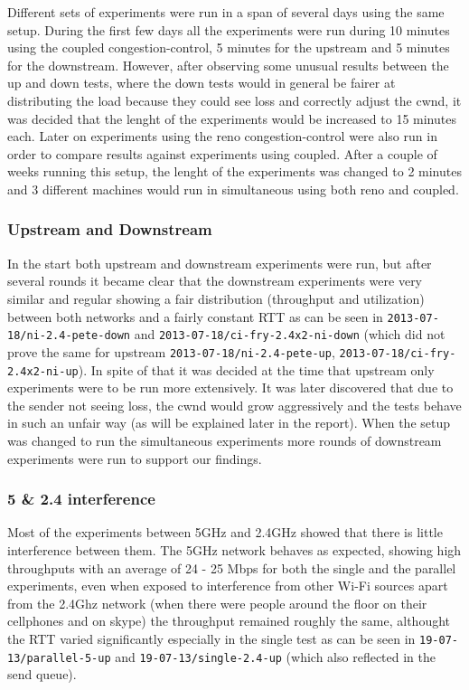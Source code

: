 \documentclass[12pt,a4paper]{article}
\begin{document}
Different sets of experiments were run in a span of several days using the same
setup. During the first few days all the experiments were run during 10 minutes
using the coupled congestion-control, 5 minutes for the upstream and 5 minutes
for the downstream. However, after observing some unusual results between the up
and down tests, where the down tests would in general be fairer at distributing
the load because they could see loss and correctly adjust the cwnd, it was
decided that the lenght of the experiments would be increased to 15 minutes
each. Later on experiments using the reno congestion-control were also run in
order to compare results against experiments using coupled. After a couple of
weeks running this setup, the lenght of the experiments was changed to 2 minutes
and 3 different machines would run in simultaneous using both reno and coupled.


\subsubsection{Upstream and Downstream}
In the start both upstream and downstream experiments were run, but after
several rounds it became clear that the downstream experiments were very similar
and regular showing a fair distribution (throughput and utilization) between
both networks and a fairly constant RTT as can be seen in
\texttt{2013-07-18/ni-2.4-pete-down} and
\texttt{2013-07-18/ci-fry-2.4x2-ni-down} (which did not prove the same for
upstream \texttt{2013-07-18/ni-2.4-pete-up},
\texttt{2013-07-18/ci-fry-2.4x2-ni-up}). In spite of that it was decided at the
time that upstream only experiments were to be run more extensively. It was
later discovered that due to the sender not seeing loss, the cwnd would grow
aggressively and the tests behave in such an unfair way (as will be explained
later in the report). When the setup was changed to run the simultaneous
experiments more rounds of downstream experiments were run to support our
findings.

\subsubsection{5 \& 2.4 interference}
Most of the experiments between 5GHz and 2.4GHz showed that there is little
interference between them. The 5GHz network behaves as expected, showing high
throughputs with an average of 24 - 25 Mbps  for both the single and the
parallel experiments, even when exposed to interference from other Wi-Fi sources
apart from the 2.4Ghz network (when there were people around the floor on their
cellphones and on skype) the throughput remained roughly the same, althought the
RTT varied significantly especially in the single test as can be seen in
\texttt{19-07-13/parallel-5-up} and \texttt{19-07-13/single-2.4-up} (which also
reflected in the send queue).
\end{document}
